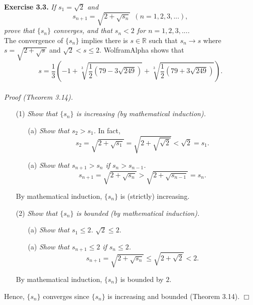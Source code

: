 \documentclass{article}
\begin{document}



\textbf{Exercise 3.3.}
\emph{If $s_1 = \sqrt{2}$ and
$$s_{n+1} = \sqrt{2+\sqrt{s_n}} \:\: (n=1,2,3,...),$$
prove that $\{s_n\}$ converges, and that $s_n < 2$ for $n=1,2,3,...$.} \\

The convergence of $\{s_n\}$
implies there is $s \in \mathbb{R}$ such that $s_n \to s$
where $s = \sqrt{2+\sqrt{s}}$ and $\sqrt{2} < s \leq 2$.
WolframAlpha shows that
$$s = \frac{1}{3}
\left(
-1 + \sqrt[3]{\frac{1}{2}(79 - 3 \sqrt{249})}
   + \sqrt[3]{\frac{1}{2}(79 + 3 \sqrt{249})}
\right).$$ \\

\emph{Proof (Theorem 3.14).}
\begin{enumerate}
\item[(1)]
\emph{Show that $\{s_n\}$ is increasing (by mathematical induction).}
  \begin{enumerate}
  \item[(a)]
  \emph{Show that $s_2 > s_1$.}
  In fact,
  $$s_2 = \sqrt{2+\sqrt{s_1}} = \sqrt{2+\sqrt{\sqrt{2}}} < \sqrt{2} = s_1.$$
  \item[(a)]
  \emph{Show that $s_{n+1} > s_{n}$ if $s_{n} > s_{n-1}$.}
  $$s_{n+1} = \sqrt{2+\sqrt{s_{n}}} > \sqrt{2+\sqrt{s_{n-1}}} = s_n.$$
  \end{enumerate}
By mathematical induction, $\{s_n\}$ is (strictly) increasing.
\item[(2)]
\emph{Show that $\{s_n\}$ is bounded (by mathematical induction).}
  \begin{enumerate}
  \item[(a)]
  \emph{Show that $s_1 \leq 2$.}
  $\sqrt{2} \leq 2$.
  \item[(a)]
  \emph{Show that $s_{n+1} \leq 2$ if $s_{n} \leq 2$.}
  $$s_{n+1} = \sqrt{2+\sqrt{s_{n}}} \leq \sqrt{2+\sqrt{2}} < 2.$$
  \end{enumerate}
By mathematical induction, $\{s_n\}$ is bounded by $2$.
\end{enumerate}
Hence, $\{s_n\}$ converges since $\{s_n\}$ is increasing and bounded (Theorem 3.14).
$\Box$ \\\\



\end{document}
